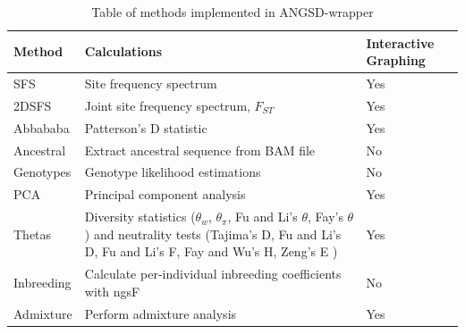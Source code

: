 \documentclass[10pt,a4paper]{article}
\newcommand{\fst}{${F_{ST}}$ }
\begin{document}
\begin{table}
\begin{center}
    \begin{tabular}{ | p{3.5cm} | p{5cm} | p{2.5cm}  |}
    \hline
    \textbf{Method} & \textbf{Calculations} & \textbf{Interactive Graphing} \\ \hline \hline
    SFS     &    Site frequency spectrum  & Yes  \\ \hline     2DSFS   &    Joint site frequency spectrum, \fst & Yes  \\ \hline 
    Abbababa  &  Patterson's D statistic & Yes  \\ \hline 
    Ancestral &  Extract ancestral sequence from BAM file  & No \\ \hline 
    Genotypes &  Genotype likelihood estimations & No  \\ \hline 
    PCA     &    Principal component analysis & Yes  \\ \hline 
    Thetas   &   Diversity statistics ($\theta_w$, $\theta_\pi$, Fu and Li's $\theta$, Fay's $\theta$) and neutrality tests (Tajima's D, Fu and Li's D, Fu and Li's F,  Fay and Wu's H, Zeng's E ) & Yes  \\ \hline 
    Inbreeding & Calculate per-individual inbreeding coefficients with ngsF & No  \\ \hline 
    Admixture  & Perform admixture analysis & Yes  \\ \hline 


    \end{tabular}
    \caption{Table of methods implemented in ANGSD-wrapper}
    \label{tab:methods}
    \end{center}
\end{table}
\end{document}
